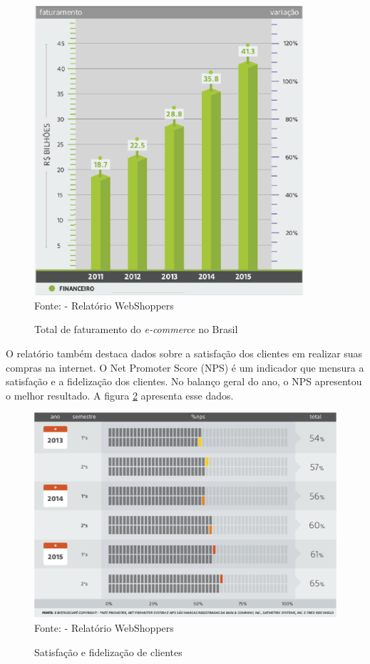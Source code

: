 \documentclass[a4paper,12pt]{monografia}
\begin{document}
\begin{figure}[H]
\centering
\caption{Total de faturamento do \textit{e-commerce} no Brasil}
\centering
\includegraphics[width=10cm]{img/webshoppers/faturamento.eps}\\
\small{Fonte:  - Relatório WebShoppers}
\label{figura:vendas}
\end{figure}

O relatório também destaca dados sobre a satisfação dos clientes em realizar suas compras na internet. O Net Promoter Score (NPS) é um indicador que mensura a satisfação e a fidelização dos clientes. No balanço geral do ano, o NPS apresentou o melhor resultado. A figura \ref{figura:nps} apresenta esse dados.

\begin{figure}[H]
\centering
\caption{Satisfação e fidelização de clientes}
\centering
\includegraphics[width=12cm]{img/webshoppers/nps.eps}\\
\small{Fonte:  - Relatório WebShoppers}
\label{figura:nps}
\end{figure}
\end{document}

